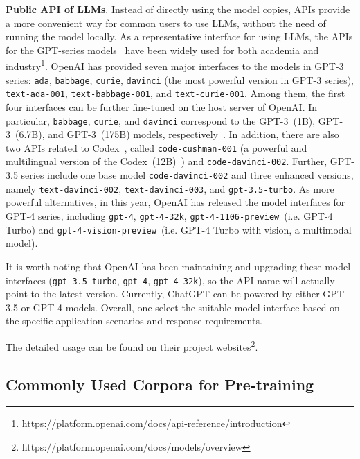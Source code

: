 \textbf{Public API of LLMs}.
\label{sec:apis_for_llms}
Instead of directly using the model copies, APIs provide a more convenient way for common users to use LLMs, without the need of running the model locally. As a representative interface for using LLMs, the APIs for the GPT-series models~\cite{Brown-NeurIPS-2020-Language, Chen-arxiv-2021-evaluating, Ouyang-arxiv-2022-Training, OpenAI-OpenAI-2023-GPT-4} have been widely used for both academia and industry\footnote{{https://platform.openai.com/docs/api-reference/introduction}}. OpenAI has provided  {seven major interfaces to the models in GPT-3 series: \texttt{ada}, \texttt{babbage}, \texttt{curie}, \texttt{davinci} (the most powerful version in GPT-3 series), \texttt{text-ada-001}, \texttt{text-babbage-001}, and \texttt{text-curie-001}.}  Among them, the first four interfaces can be further fine-tuned on the host server of OpenAI. In particular, \texttt{babbage}, \texttt{curie}, and \texttt{davinci} correspond to the GPT-3~(1B), GPT-3~(6.7B), and GPT-3~(175B) models, respectively~\cite{Brown-NeurIPS-2020-Language}. In addition, there are also two APIs related to Codex~\cite{Chen-arxiv-2021-evaluating}, called \texttt{code-cushman-001} (a powerful and multilingual version of the Codex~(12B)~\cite{Chen-arxiv-2021-evaluating}) and \texttt{code-davinci-002}.
Further, GPT-3.5 series include one base model \texttt{code-davinci-002} and  three enhanced versions, namely \texttt{text-davinci-002}, \texttt{text-davinci-003}, and \texttt{gpt-3.5-turbo}.
As more powerful alternatives, in this year, OpenAI has released the model interfaces for GPT-4 series, including \texttt{gpt-4}, \texttt{gpt-4-32k}, \texttt{gpt-4-1106-preview}~(i.e. GPT-4 Turbo) and \texttt{gpt-4-vision-preview}~(i.e. GPT-4 Turbo with vision, a multimodal model). 

It is worth noting that OpenAI has been  maintaining and upgrading these model interfaces (\texttt{gpt-3.5-turbo}, \texttt{gpt-4}, \texttt{gpt-4-32k}), so the API name will actually point to the latest version. Currently, ChatGPT can be  powered by either GPT-3.5 or GPT-4 models.  Overall, one select the suitable model interface based on the specific application scenarios and response requirements.

The detailed usage can be found on their project websites\footnote{https://platform.openai.com/docs/models/overview}.

\subsection{Commonly Used Corpora for Pre-training}
\label{sec:commonly_used_corpora}


